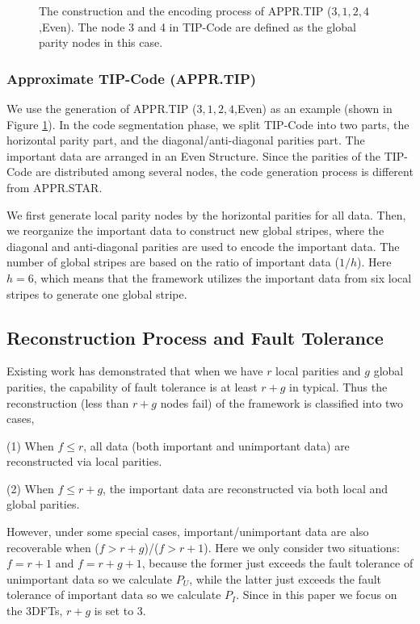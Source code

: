 \documentclass[sigconf]{acmart}
\begin{document}
\begin{figure}[ht]
\caption{The construction and the encoding process of APPR.TIP ($3,1,2,4$,Even). The node 3 and 4 in TIP-Code are defined as the global parity nodes in this case.}\label{fig-ap-TIP}

\end{figure}

\subsubsection{Approximate TIP-Code (APPR.TIP)}

We use the generation of APPR.TIP ($3,1,2,4$,Even) as an example (shown in Figure \ref{fig-ap-TIP}). In the code segmentation phase, we split TIP-Code into two parts, the horizontal parity part, and the diagonal/anti-diagonal parities part. The important data are arranged in an Even Structure. Since the parities of the TIP-Code are distributed among several nodes, the code generation process is different from APPR.STAR.

We first generate local parity nodes by the horizontal parities for all data. Then, we reorganize the important data to construct new global stripes, where the diagonal and anti-diagonal parities are used to encode the important data. The number of global stripes are based on the ratio of important data ($1/h$). Here $h=6$, which means that the framework utilizes the important data from six local stripes to generate one global stripe.


\subsection{Reconstruction Process and Fault Tolerance}\label{ReconstructionFT}
Existing work \cite{LRC} has demonstrated that when we have $r$ local parities and $g$ global parities, the capability of fault tolerance is at least $r+g$ in typical. Thus the reconstruction (less than $r+g$ nodes fail) of the framework is classified into two cases,

(1) When $f \leqslant r$, all data (both important and unimportant data) are reconstructed via local parities.

(2) When $f \leqslant r+g$, the important data are reconstructed via both local and global parities.

However, under some special cases, important/unimportant data are also recoverable when ($f>r+g$)/($f > r+1$).
Here we only consider two situations: $f=r+1$ and $f=r+g+1$, because the former just exceeds the fault tolerance of unimportant data so we calculate $P_U$, while the latter just exceeds the fault tolerance of important data so we calculate $P_I$.
 Since in this paper we focus on the 3DFTs, $r+g$ is set to 3.
\end{document}
